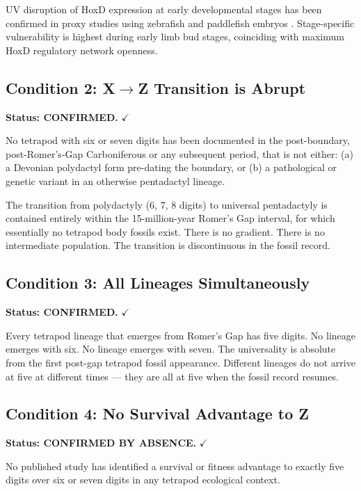 \documentclass[11pt, a4paper]{article}
\begin{document}
UV disruption of HoxD expression at early
developmental stages has been confirmed in proxy
studies using zebrafish and paddlefish embryos
\cite{hoxduv2022}.
Stage-specific vulnerability is highest during
early limb bud stages, coinciding with maximum
HoxD regulatory network openness.

\subsection{Condition 2: X$\rightarrow$Z Transition
is Abrupt}

\textbf{Status: CONFIRMED.} \textcolor{confirmgreen}{$\checkmark$}

No tetrapod with six or seven digits has been
documented in the post-boundary, post-Romer's-Gap
Carboniferous or any subsequent period, that is
not either:
(a) a Devonian polydactyl form pre-dating the
boundary, or
(b) a pathological or genetic variant in an
otherwise pentadactyl lineage.

The transition from polydactyly (6, 7, 8 digits)
to universal pentadactyly is contained entirely
within the 15-million-year Romer's Gap interval,
for which essentially no tetrapod body fossils exist.
There is no gradient. There is no intermediate
population. The transition is discontinuous in
the fossil record.

\subsection{Condition 3: All Lineages Simultaneously}

\textbf{Status: CONFIRMED.} \textcolor{confirmgreen}{$\checkmark$}

Every tetrapod lineage that emerges from Romer's
Gap has five digits.
No lineage emerges with six. No lineage emerges
with seven.
The universality is absolute from the first
post-gap tetrapod fossil appearance.
Different lineages do not arrive at five at
different times --- they are all at five when
the fossil record resumes.

\subsection{Condition 4: No Survival Advantage to Z}

\textbf{Status: CONFIRMED BY ABSENCE.}
\textcolor{confirmgreen}{$\checkmark$}

No published study has identified a survival or
fitness advantage to exactly five digits over six
or seven digits in any tetrapod ecological context.
\end{document}
